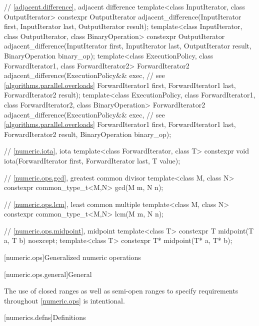 \begin{codeblock}
{  // \ref{adjacent.difference}, adjacent difference
  template<class InputIterator, class OutputIterator>
    constexpr OutputIterator
      adjacent_difference(InputIterator first, InputIterator last,
                          OutputIterator result);
  template<class InputIterator, class OutputIterator, class BinaryOperation>
    constexpr OutputIterator
      adjacent_difference(InputIterator first, InputIterator last,
                          OutputIterator result, BinaryOperation binary_op);
  template<class ExecutionPolicy, class ForwardIterator1, class ForwardIterator2>
    ForwardIterator2
      adjacent_difference(ExecutionPolicy&& exec,               // see \ref{algorithms.parallel.overloads}
                          ForwardIterator1 first, ForwardIterator1 last,
                          ForwardIterator2 result);
  template<class ExecutionPolicy, class ForwardIterator1, class ForwardIterator2,
           class BinaryOperation>
    ForwardIterator2
      adjacent_difference(ExecutionPolicy&& exec,               // see \ref{algorithms.parallel.overloads}
                          ForwardIterator1 first, ForwardIterator1 last,
                          ForwardIterator2 result, BinaryOperation binary_op);

  // \ref{numeric.iota}, iota
  template<class ForwardIterator, class T>
    constexpr void iota(ForwardIterator first, ForwardIterator last, T value);

  // \ref{numeric.ops.gcd}, greatest common divisor
  template<class M, class N>
    constexpr common_type_t<M,N> gcd(M m, N n);

  // \ref{numeric.ops.lcm}, least common multiple
  template<class M, class N>
    constexpr common_type_t<M,N> lcm(M m, N n);

  // \ref{numeric.ops.midpoint}, midpoint
  template<class T>
    constexpr T midpoint(T a, T b) noexcept;
  template<class T>
    constexpr T* midpoint(T* a, T* b);
}
\end{codeblock}

[numeric.ops]{Generalized numeric operations}

[numeric.ops.general]{General}

\pnum
\begin{note}
The use of closed ranges as well as semi-open ranges
to specify requirements throughout \ref{numeric.ops} is intentional.
\end{note}

[numerics.defns]{Definitions}

